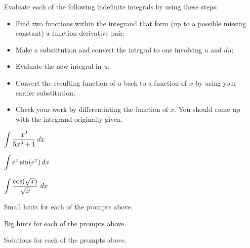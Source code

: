 \begin{activity} \label{A:4.6.1}  Evaluate each of the following indefinite integrals by using these steps:
\begin{itemize}
  \item Find two functions within the integrand that form (up to a possible missing constant) a function-derivative pair;
  \item Make a substitution and convert the integral to one involving $u$ and $du$;
  \item Evaluate the new integral in $u$;
  \item Convert the resulting function of $u$ back to a function of $x$ by using your earlier substitution;
  \item Check your work by differentiating the function of $x$.  You should come up with the integrand originally given.
\end{itemize}

\ba
	\item $\displaystyle \int \frac{x^2}{5x^3+1} \, dx$
	\item $\displaystyle \int e^x \sin(e^x) \, dx$
	\item $\displaystyle \int \frac{\cos(\sqrt{x})}{\sqrt{x}}~dx$
\ea
\end{activity}
\begin{smallhint}
\ba
	\item Small hints for each of the prompts above.
\ea
\end{smallhint}
\begin{bighint}
\ba
	\item Big hints for each of the prompts above.
\ea
\end{bighint}
\begin{activitySolution}
\ba
	\item Solutions for each of the prompts above.
\ea
\end{activitySolution}
\aftera